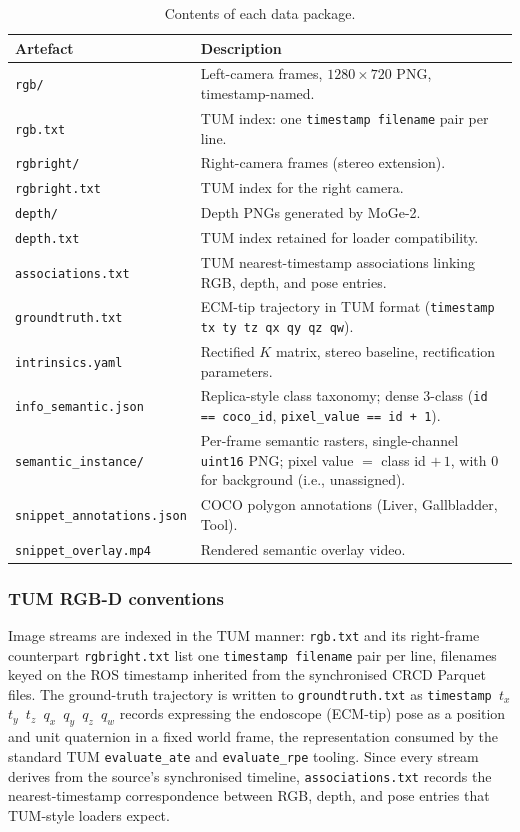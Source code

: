 \documentclass{article}
\begin{document}
\begin{table}[ht]
\centering
\caption{Contents of each data package.}
\label{tab:snippet_contents}
\begin{tabular}{lp{7cm}}
\hline
\textbf{Artefact} & \textbf{Description} \\
\hline
\texttt{rgb/} & Left-camera frames, $1280\times720$ PNG, timestamp-named. \\
\texttt{rgb.txt} & TUM index: one \texttt{timestamp filename} pair per line. \\
\texttt{rgbright/} & Right-camera frames (stereo extension). \\
\texttt{rgbright.txt} & TUM index for the right camera. \\
\texttt{depth/} & Depth PNGs generated by MoGe-2. \\
\texttt{depth.txt} & TUM index retained for loader compatibility. \\
\texttt{associations.txt} & TUM nearest-timestamp associations linking RGB, depth, and pose entries. \\
\texttt{groundtruth.txt} & ECM-tip trajectory in TUM format (\texttt{timestamp tx ty tz qx qy qz qw}). \\
\texttt{intrinsics.yaml} & Rectified $K$ matrix, stereo baseline, rectification parameters. \\
\texttt{info\_semantic.json} & Replica-style class taxonomy; dense 3-class (\texttt{id == coco\_id}, \texttt{pixel\_value == id + 1}). \\
\texttt{semantic\_instance/} & Per-frame semantic rasters, single-channel \texttt{uint16} PNG; pixel value $=$ class id $+\,1$, with 0 for background (i.e., unassigned). \\
\texttt{snippet\_annotations.json} & COCO polygon annotations (Liver, Gallbladder, Tool). \\
\texttt{snippet\_overlay.mp4} & Rendered semantic overlay video. \\
\hline
\end{tabular}
\end{table}

\subsubsection{TUM RGB-D conventions}

Image streams are indexed in the TUM manner: \texttt{rgb.txt} and its right-frame counterpart \texttt{rgbright.txt} list one \texttt{timestamp filename} pair per line, filenames keyed on the ROS timestamp inherited from the synchronised CRCD Parquet files. The ground-truth trajectory is written to \texttt{groundtruth.txt} as \texttt{timestamp $t_x$ $t_y$ $t_z$ $q_x$ $q_y$ $q_z$ $q_w$} records expressing the endoscope (ECM-tip) pose as a position and unit quaternion in a fixed world frame, the representation consumed by the standard TUM \texttt{evaluate\_ate} and \texttt{evaluate\_rpe} tooling. Since every stream derives from the source's synchronised timeline, \texttt{associations.txt} records the nearest-timestamp correspondence between RGB, depth, and pose entries that TUM-style loaders expect.
\end{document}
